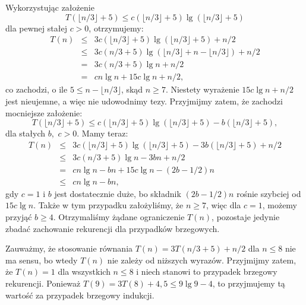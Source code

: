 Wykorzystując założenie
\[
	T(\lfloor n/3\rfloor+5) \le c(\lfloor n/3\rfloor+5)\lg(\lfloor n/3\rfloor+5)
\]
dla pewnej stałej $c>0$, otrzymujemy:
\begin{eqnarray*}
	T(n) &\le& 3c(\lfloor n/3\rfloor+5)\lg(\lfloor n/3\rfloor+5)+n/2 \\
	&\le& 3c(n/3+5)\lg(\lfloor n/3\rfloor+n-\lfloor n/3\rfloor)+n/2 \\
	&=& 3c(n/3+5)\lg n+n/2 \\
	&=& cn\lg n+15c\lg n+n/2,
\end{eqnarray*}
co zachodzi, o ile $5\le n-\lfloor n/3\rfloor$, skąd $n\ge7$. Niestety wyrażenie $15c\lg n+n/2$ jest nieujemne, a więc nie udowodnimy tezy. Przyjmijmy zatem, że zachodzi mocniejsze założenie:
\[
	T(\lfloor n/3\rfloor+5) \le c(\lfloor n/3\rfloor+5)\lg(\lfloor n/3\rfloor+5)-b(\lfloor n/3\rfloor+5),
\]
dla stałych $b$,~$c>0$. Mamy teraz:
\begin{eqnarray*}
	T(n) &\le& 3c(\lfloor n/3\rfloor+5)\lg(\lfloor n/3\rfloor+5)-3b(\lfloor n/3\rfloor+5)+n/2 \\
	&\le& 3c(n/3+5)\lg n-3bn+n/2 \\
	&=& cn\lg n-bn+15c\lg n-(2b-1/2)n \\
	&\le& cn\lg n-bn,
\end{eqnarray*}
gdy $c=1$ i $b$ jest dostatecznie duże, bo składnik $(2b-1/2)n$ rośnie szybciej od $15c\lg n$. Także w tym przypadku założyliśmy, że $n\ge7$, więc dla $c=1$, możemy przyjąć $b\ge4$. Otrzymaliśmy żądane ograniczenie $T(n)$, pozostaje jedynie zbadać zachowanie rekurencji dla przypadków brzegowych.

Zauważmy, że stosowanie równania $T(n)=3T(n/3+5)+n/2$ dla $n\le8$ nie ma sensu, bo wtedy $T(n)$ nie zależy od niższych wyrazów. Przyjmijmy zatem, że $T(n)=1$ dla wszystkich $n\le8$ i niech stanowi to przypadek brzegowy rekurencji. Ponieważ $T(9)=3T(8)+4{,}5\le9\lg9-4$, to przyjmujemy tą wartość za przypadek brzegowy indukcji.

